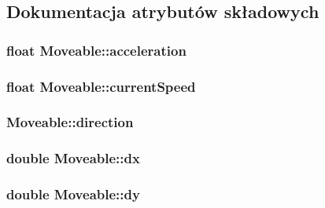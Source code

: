 \subsection{Dokumentacja atrybutów składowych}
\hypertarget{class_moveable_a66d7998654c97643c5f95fdf26e886cf}{
\subsubsection[{acceleration}]{\setlength{\rightskip}{0pt plus 5cm}float Moveable\-::acceleration\hspace{0.3cm}{\ttfamily [protected]}}}\label{class_moveable_a66d7998654c97643c5f95fdf26e886cf}
\hypertarget{class_moveable_acbdd4bee0a3e3e9edffa29bb95d692fd}{
\subsubsection[{current\-Speed}]{\setlength{\rightskip}{0pt plus 5cm}float Moveable\-::current\-Speed\hspace{0.3cm}{\ttfamily [protected]}}}\label{class_moveable_acbdd4bee0a3e3e9edffa29bb95d692fd}
\hypertarget{class_moveable_a1bcc6c440945c5204b2819fe040e8396}{
\subsubsection[{direction}]{ Moveable\-::direction\hspace{0.3cm}{\ttfamily [protected]}}}\label{class_moveable_a1bcc6c440945c5204b2819fe040e8396}
\hypertarget{class_moveable_ae84e95afddc19665f9fda53bfcd1c3a3}{
\subsubsection[{dx}]{\setlength{\rightskip}{0pt plus 5cm}double Moveable\-::dx\hspace{0.3cm}{\ttfamily [protected]}}}\label{class_moveable_ae84e95afddc19665f9fda53bfcd1c3a3}
\hypertarget{class_moveable_ab110147d19762b3e03c9421a2232ae82}{
\subsubsection[{dy}]{\setlength{\rightskip}{0pt plus 5cm}double Moveable\-::dy\hspace{0.3cm}{\ttfamily [protected]}}}\label{class_moveable_ab110147d19762b3e03c9421a2232ae82}
